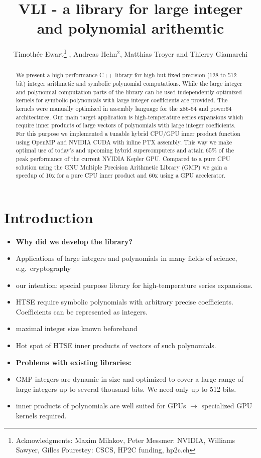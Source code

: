 \documentclass[oribibl]{llncs2e/llncs}
\title{VLI - a library for large integer and polynomial arithemtic}
\author{Timoth\'ee Ewart\inst{1}\thanks{Acknowledgments: Maxim Milakov, Peter Messmer:   NVIDIA,   Williams Sawyer, Gilles Fourestey:  CSCS, HP2C funding, hp2c.ch}  , Andreas Hehn$^2$, Matthias Troyer\inst{2} and Thierry Giamarchi\inst{1}}
\institute{Universit\'e de Gen\`eve, \email{timothee.ewart@gmail.com}  \and Eidgen\"ossische Technische Hochschule Z\"urich }
\begin{document}
\maketitle


\begin{abstract}
We present a high-performance C++ library for high but fixed precision
(128 to 512 bit) integer arithmetic and symbolic polynomial
computations. While the large integer and polynomial computation parts
of the library can be used independently optimized kernels for symbolic
polynomials with large integer coefficients are provided. The kernels
were manually optimized in assembly language for the x86-64 and power64
architectures. Our main target application is high-temperature series
expansions which require inner products of large vectors of polynomials
with large integer coefficients. For this purpose we implemented a
tunable hybrid CPU/GPU inner product function using OpenMP and NVIDIA
CUDA with inline PTX assembly. This way we make optimal use of today's
and upcoming hybrid supercomputers and attain $65\%$ of the peak
performance of the current NVIDIA Kepler GPU. Compared to a pure CPU
solution using the GNU Multiple Precision Arithmetic Library (GMP) we
gain a speedup of 10x for a pure CPU inner product and 60x using a GPU
accelerator.
\end{abstract}

\section{Introduction}
\begin{itemize}
\item {\bf Why did we develop the library?}
\item Applications of large integers and polynomials in many fields of science, e.g.\ cryptography
\item our intention: special purpose library for high-temperature series expansions.
\item HTSE require symbolic polynomials with arbitrary precise coefficients. Coefficients can be represented as integers.
\item maximal integer size known beforehand
\item Hot spot of HTSE inner products of vectors of such polynomials.
\item {\bf Problems with existing libraries:}
\item GMP integers \cite{GMP} are dynamic in size and optimized to cover a large range of large integers up to several thousand bits. We need only up to 512 bits.
\item inner products of polynomials are well suited for GPUs $\rightarrow$ specialized GPU kernels required.
\end{itemize}
\end{document}
